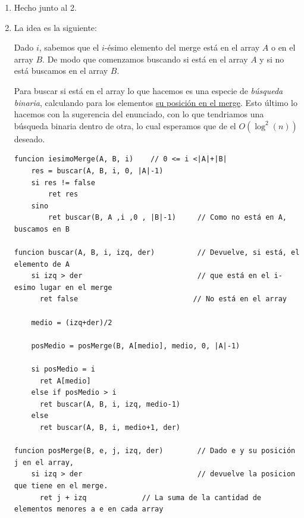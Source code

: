 \begin{enumerate}[label=\arabic*)]
  \item Hecho junto al 2.

  \item La idea es la siguiente:

        Dado $i$, sabemos que el $i$-ésimo elemento del merge está en el array $A$ o en el array $B$.
        De modo que comenzamos buscando si está en el array $A$ y si no está buscamos en el array $B$.

        Para buscar si está en el array lo que hacemos es una especie de \textit{búsqueda binaria},
        calculando para los elementos \ul{su posición en el merge}. Esto último lo hacemos con la sugerencia del enunciado,
        con lo que tendriamos una búsqueda binaria dentro de otra, lo cual esperamos que de el $O(\log^{2}(n))$ deseado.

        \begin{tcolorbox}
          \begin{lstlisting}
funcion iesimoMerge(A, B, i)    // 0 <= i <|A|+|B|
    res = buscar(A, B, i, 0, |A|-1)
    si res != false
        ret res
    sino
        ret buscar(B, A ,i ,0 , |B|-1)     // Como no está en A, buscamos en B

funcion buscar(A, B, i, izq, der)          // Devuelve, si está, el elemento de A
    si izq > der                           // que está en el i-esimo lugar en el merge 
      ret false                           // No está en el array

    medio = (izq+der)/2

    posMedio = posMerge(B, A[medio], medio, 0, |A|-1)

    si posMedio = i
      ret A[medio]
    else if posMedio > i
      ret buscar(A, B, i, izq, medio-1)
    else
      ret buscar(A, B, i, medio+1, der)

funcion posMerge(B, e, j, izq, der)        // Dado e y su posición j en el array,
    si izq > der                           // devuelve la posicion que tiene en el merge.
      ret j + izq             // La suma de la cantidad de elementos menores a e en cada array


\end{lstlisting}
\end{tcolorbox}
\end{enumerate}

